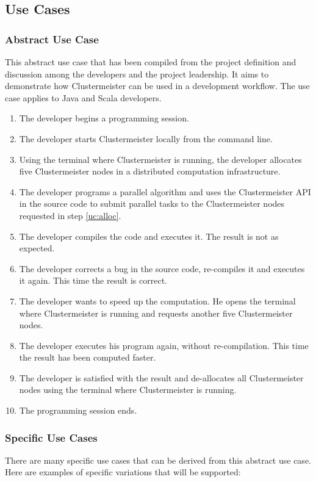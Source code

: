 \documentclass[12pt]{article}
\begin{document}
\subsection{Use Cases}

\subsubsection*{Abstract Use Case}
This abstract use case that has been compiled from the project definition and discussion among the developers and the project leadership. It aims to demonstrate how Clustermeister can be used in a development workflow. The use case applies to Java and Scala developers.

\begin{enumerate}
\item \label{uc:start}The developer begins a programming session.
\item The developer starts Clustermeister locally from the command line.
\item \label{uc:alloc}Using the terminal where Clustermeister is running, the developer allocates five Clustermeister nodes in a distributed computation infrastructure.
\item \label{uc:prog}The developer programs a parallel algorithm and uses the Clustermeister API in the source code to submit parallel tasks to the Clustermeister nodes requested in step \ref{uc:alloc}.
\item The developer compiles the code and executes it. The result is not as expected.
\item The developer corrects a bug in the source code, re-compiles it and executes it again. This time the result is correct.
\item The developer wants to speed up the computation. He opens the terminal where Clustermeister is running and requests another five Clustermeister nodes.
\item The developer executes his program again, without re-compilation. This time the result has been computed faster.
\item The developer is satisfied with the result and de-allocates all Clustermeister nodes using the terminal where Clustermeister is running.
\item The programming session ends.
\end{enumerate}

\subsubsection*{Specific Use Cases}
There are many specific use cases that can be derived from this abstract use case. Here are examples of specific variations that will be supported:
\end{document}
